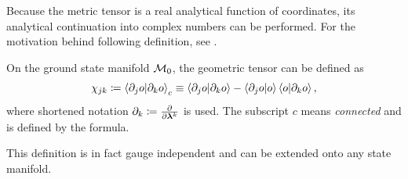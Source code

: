 
Because the metric tensor is a real analytical function of coordinates, its analytical continuation into complex numbers can be performed. For the motivation behind following definition, see \cite{cheng_quantum_2013}.

\begin{definition}
    On the ground state manifold $\mathcal{M}_0$, the geometric tensor can be defined as
    \begin{equation}
        \chi_{jk}\coloneqq \braket{\partial_j o|\partial_k o}_c \equiv \braket{\partial_j o|\partial_k o} - \braket{\partial_j o|o}\braket{o|\partial_k o},
        \label{eq:geometricTensor}
    \end{equation}
    where shortened notation $\partial_k\coloneqq\frac{\partial }{\partial {\bm\lambda}^k}$ is used. The subscript $c$ means \emph{connected} and is defined by the formula.
\end{definition}
This definition is in fact gauge independent and can be extended onto any state manifold. 

